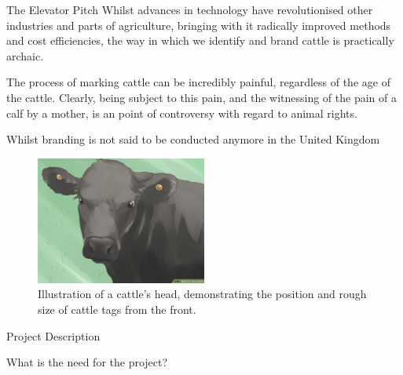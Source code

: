

\begin{subsection}{The Elevator Pitch}
  Whilst advances in technology have revolutionised other industries and parts of agriculture, bringing with it radically improved methods and cost efficiencies, the way in which we identify and brand cattle is practically archaic.

  The process of marking cattle can be incredibly painful, regardless of the age of the cattle. Clearly, being subject to this pain, and the witnessing of the pain of a calf by a mother, is an point of controversy with regard to animal rights.

  Whilst branding is not said to be conducted anymore in the United Kingdom \cite{theguardian1}

  \begin{figure}[H]
  	\centering
    \includegraphics[width=0.5\textwidth]{images/cattle-with-ear-tag.jpg}
  	\caption[Cattle ear tagging]{
      Illustration of a cattle's head, demonstrating the position and rough size of cattle tags from the front.
  	}
  \end{figure}
\end{subsection}


\begin{subsection}{Project Description}

\end{subsection}


\begin{subsection}{What is the need for the project?}

\end{subsection}
